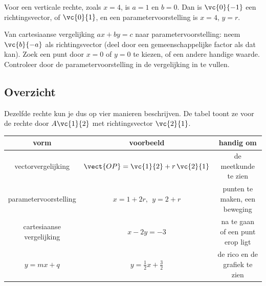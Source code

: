 
Voor een verticale rechte, zoals $x = 4$, is $a = 1$ en $b = 0$. Dan is $\vc{0}{-1}$ een richtingsvector, of $\vc{0}{1}$, en een parametervoorstelling is $x = 4$, $y = r$.

\begin{werkwijze}
Van cartesiaanse vergelijking $ax + by = c$ naar parametervoorstelling: neem $\vc{b}{-a}$ als richtingsvector (deel door een gemeenschappelijke factor als dat kan). Zoek een punt door $x = 0$ of $y = 0$ te kiezen, of een andere handige waarde. Controleer door de parametervoorstelling in de vergelijking in te vullen.
\end{werkwijze}

\begin{oefeningen}
\end{oefeningen}

\subsection{Overzicht}

Dezelfde rechte kun je dus op vier manieren beschrijven. De tabel toont ze voor de rechte door $A\vc{1}{2}$ met richtingsvector $\vc{2}{1}$.

\begin{center}
\renewcommand{\arraystretch}{1.6}
\begin{tabular}{|c|c|c|}
\hline
\textbf{vorm} & \textbf{voorbeeld} & \textbf{handig om} \\ \hline
vectorvergelijking & $\vect{OP} = \vc{1}{2} + r\,\vc{2}{1}$ & de meetkunde te zien \\ \hline
parametervoorstelling & $x = 1 + 2r,\ \ y = 2 + r$ & punten te maken, een beweging \\ \hline
cartesiaanse vergelijking & $x - 2y = -3$ & na te gaan of een punt erop ligt \\ \hline
$y = mx + q$ & $y = \tfrac12 x + \tfrac32$ & de rico en de grafiek te zien \\ \hline
\end{tabular}
\end{center}

